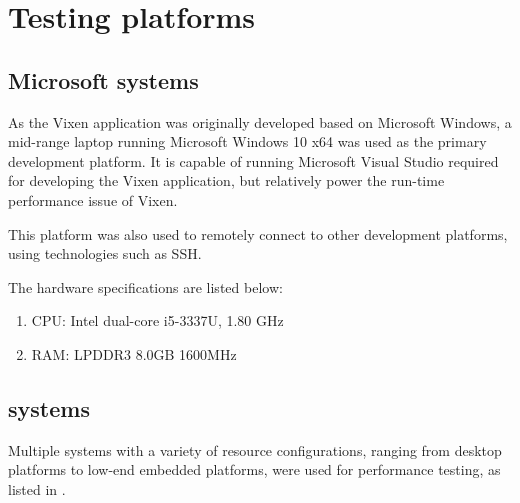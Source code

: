 \section{Testing platforms}

\subsection{Microsoft  systems}

As the Vixen application was originally developed based on Microsoft Windows,  a mid-range laptop running Microsoft Windows 10 x64 was used as the primary development platform. It is capable of running Microsoft Visual Studio  required for developing the Vixen application, but  relatively  power the run-time performance issue of Vixen.

This platform was also used to remotely connect to other development platforms, using technologies such as SSH.

The hardware specifications are listed below:

\begin{enumerate}[noitemsep,label={}]
  \item CPU: Intel dual-core i5-3337U, 1.80 GHz
  \item RAM: LPDDR3 8.0GB 1600MHz
\end{enumerate}

\subsection{ systems}
\label{sec:systems}

Multiple  systems with a variety of resource configurations, ranging from  desktop platforms to low-end embedded platforms, were used for performance testing, as listed in . 

